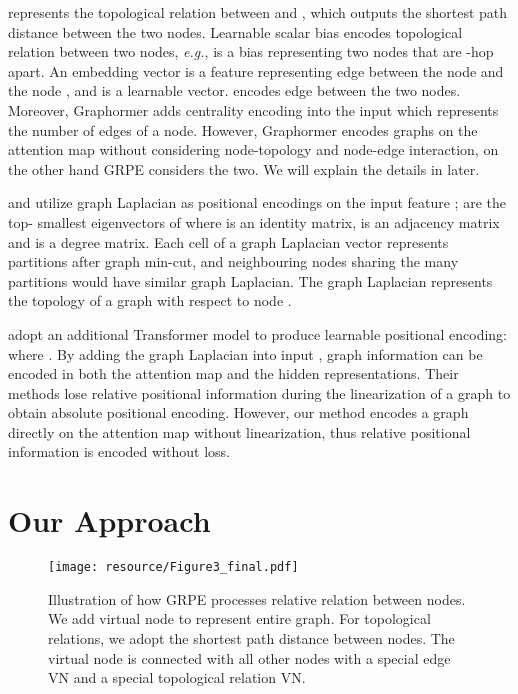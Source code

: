 \documentclass[letterpaper]{article} \usepackage{aaai23}  \usepackage{times}  \usepackage{helvet}  \usepackage{courier}  \usepackage[hyphens]{url}  \usepackage{graphicx} \urlstyle{rm} \def\UrlFont{\rm}  \usepackage{natbib}  \usepackage{caption} \frenchspacing  \setlength{\pdfpagewidth}{8.5in} \setlength{\pdfpageheight}{11in} \usepackage{algorithm}
\newcommand{\eg}{\textit{e.g.}}
\begin{document}
 represents the topological relation between  and , which outputs the shortest path distance between the two nodes.
Learnable scalar bias  encodes topological relation between two nodes, \eg,  is a bias representing two nodes that are -hop apart.
An embedding vector  is a feature representing edge between the node  and the node , and  is a learnable vector.
 encodes edge between the two nodes.
Moreover, Graphormer adds centrality encoding into the input  which represents the number of edges of a node.
However, Graphormer encodes graphs on the attention map without considering node-topology and node-edge interaction, on the other hand GRPE considers the two.
We will explain the details in later.

\citeauthor{gt_dwivedi2020generalization} and \citeauthor{san_kreuzer2021rethinking}  utilize graph Laplacian \citep{belkin2003laplacian}  as positional encodings on the input feature ;  are the top- smallest eigenvectors of  where  is an identity matrix,  is an adjacency matrix and  is a degree matrix.
Each cell of a graph Laplacian vector represents partitions after graph min-cut, and neighbouring nodes sharing the many partitions would have similar graph Laplacian.
The graph Laplacian  represents the topology of a graph with respect to node .



\citeauthor{san_kreuzer2021rethinking} adopt an additional Transformer model  to produce learnable positional encoding:  where .
By adding the graph Laplacian into input , graph information can be encoded in both the attention map and the hidden representations.
Their methods lose relative positional information during the linearization of a graph to obtain absolute positional encoding.
However, our method encodes a graph directly on the attention map without linearization, thus relative positional information is encoded without loss. \section{Our Approach}
\label{sec:method}

\begin{figure}[t]
\hspace{4.7cm}\centerline{\texttt{[image: resource/Figure3\_final.pdf]}}
\vspace{-5cm}
\caption{
Illustration of how GRPE processes relative relation between nodes.
We add virtual node  to represent entire graph. 
For topological relations, we adopt the shortest path distance between nodes.
The virtual node is connected with all other nodes with a special edge VN and a special topological relation VN.
}
\label{fig:figure3}
\end{figure}
\end{document}
